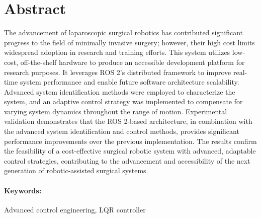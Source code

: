 

\section*{\centering Abstract}
The advancement of laparoscopic surgical robotics has contributed significant progress to the field of minimally invasive surgery; however, their high cost limits widespread adoption in research and training efforts. This system utilizes low-cost, off-the-shelf hardware to produce an accessible development platform for research purposes. It leverages ROS 2's distributed framework to improve real-time system performance and enable future software architecture scalability. Advanced system identification methods were employed to characterize the system, and an adaptive control strategy was implemented to compensate for varying system dynamics throughout the range of motion. Experimental validation demonstrates that the ROS 2-based architecture, in combination with the advanced system identification and control methods, provides significant performance improvements over the previous implementation. The results confirm the feasibility of a cost-effective surgical robotic system with advanced, adaptable control strategies, contributing to the advancement and accessibility of the next generation of robotic-assisted surgical systems.

\paragraph*{Keywords:} Advanced control engineering, LQR controller

\newpage
